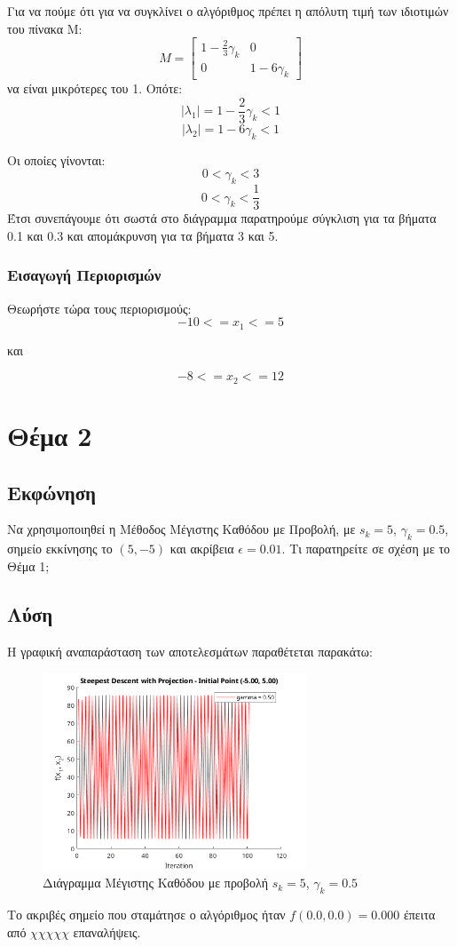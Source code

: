 \documentclass{report}
\begin{document}
Για να πούμε ότι για να συγκλίνει ο αλγόριθμος πρέπει η απόλυτη τιμή των ιδιοτιμών του πίνακα M: 
$$M = \begin{bmatrix} 1 - \frac{2}{3}\gamma_k & 0 \\ 0 & 1 - 6\gamma_k \end{bmatrix}$$
να είναι μικρότερες του 1. Οπότε:
$$|\lambda_1|= 1 - \frac{2}{3}\gamma_k < 1$$
$$|\lambda_2| = 1 - 6\gamma_k < 1$$

Οι οποίες γίνονται:
$$0 < \gamma_k < 3$$
$$0 < \gamma_k < \frac{1}{3}$$
Έτσι συνεπάγουμε ότι σωστά στο διάγραμμα παρατηρούμε σύγκλιση για τα βήματα 0.1 και 0.3 και 
απομάκρυνση για τα βήματα 3 και 5.


\subsection{Εισαγωγή Περιορισμών}
Θεωρήστε τώρα τους περιορισμούς:
$$-10 <= x_1 <= 5$$  
\begin{center}
    και
\end{center}
$$-8 <= x_2 <= 12$$

\chapter{Θέμα 2}
\section{Εκφώνηση}
Να χρησιμοποιηθεί η Μέθοδος Μέγιστης Καθόδου με Προβολή, με $s_k = 5$, $\gamma_k = 0.5$,
σημείο εκκίνησης το $(5, -5)$ και ακρίβεια $\epsilon = 0.01$. Τι παρατηρείτε σε σχέση με το 
Θέμα 1;

\section{Λύση}

Η γραφική αναπαράσταση των αποτελεσμάτων παραθέτεται παρακάτω:
\begin{figure}[H]
    \centering
    \includegraphics[width=0.7\textwidth]{media/thema2.png}
    \caption{Διάγραμμα Μέγιστης Καθόδου με προβολή $s_k = 5$, $\gamma_k = 0.5$}
\end{figure}
Το ακριβές σημείο που σταμάτησε ο αλγόριθμος ήταν $f(0.0, 0.0) = 0.000$ έπειτα από 
$χχχχχ$ επαναλήψεις.
\end{document}
